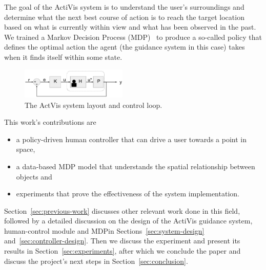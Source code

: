 \documentclass[a4paper, twoside]{article}
\begin{document}
The goal of the ActiVis system is to understand the user's surroundings and determine what the next best course of action is to reach the target location based on what is currently within view and what has been observed in the past. We trained a Markov Decision Process (MDP)~\cite{bellman1957markovian} to produce a so-called policy that defines the optimal action the agent (the guidance system in this case) takes when it finds itself within some state.  

\begin{figure}
  \centering
  \includegraphics[width=0.45\textwidth]{figures/control_loop.png}
  \caption{The ActVis system layout and control loop. }\label{fig:control-loop}
\end{figure}

This work's contributions are 

\begin{itemize}
  \item a policy-driven human controller that can drive a user towards a point in space,
  \item a data-based MDP model that understands the spatial relationship between objects and
  \item experiments that prove the effectiveness of the system implementation.
\end{itemize}


Section~\ref{sec:previous-work} discusses other relevant work done in this field, followed by a detailed discussion on the design of the ActiVis guidance system, human-control module and MDP\@ in Sections~\ref{sec:system-design} and~\ref{sec:controller-design}. Then we discuss the experiment and present its results in Section~\ref{sec:experiments}, after which we conclude the paper and discuss the project's next steps in Section~\ref{sec:conclusion}. 
\end{document}
